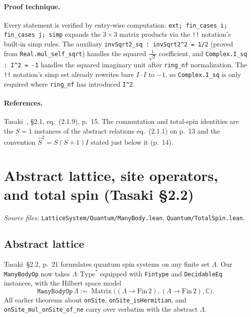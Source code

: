 \documentclass[a4paper,11pt]{article}
\begin{document}
\paragraph{Proof technique.}
Every statement is verified by entry-wise computation:
\texttt{ext; fin\_cases i; fin\_cases j; simp} expands the $3 \times 3$
matrix products via the \texttt{!!} notation's built-in simp rules.
The auxiliary \texttt{invSqrt2\_sq : invSqrt2\textasciicircum 2 = 1/2}
(proved from \texttt{Real.mul\_self\_sqrt}) handles the squared
$\tfrac{1}{\sqrt{2}}$ coefficient, and \texttt{Complex.I\_sq : I\textasciicircum 2 = -1}
handles the squared imaginary unit after \texttt{ring\_nf} normalization.
The \texttt{!!} notation's simp set already rewrites bare $I \cdot I$ to
$-1$, so \texttt{Complex.I\_sq} is only required where
\texttt{ring\_nf} has introduced \texttt{I\textasciicircum 2}.

\paragraph{References.}
Tasaki~\cite{Tasaki:QMB}, §2.1, eq.~(2.1.9), p.~15.
The commutation and total-spin identities are the $S = 1$ instances of
the abstract relations eq.~(2.1.1) on p.~13 and the convention
$\hat S^2 = S(S+1) I$ stated just below it (p.~14).

\section{Abstract lattice, site operators, and total spin (Tasaki §2.2)}
\label{sec:sec22}

\emph{Source files:} \texttt{LatticeSystem/Quantum/ManyBody.lean},
\texttt{Quantum/TotalSpin.lean}.

\subsection{Abstract lattice}

Tasaki~§2.2, p.~21 formulates quantum spin systems on any finite set
$\Lambda$. Our \texttt{ManyBodyOp} now takes $\Lambda : \text{Type}^*$
equipped with \texttt{Fintype} and \texttt{DecidableEq} instances, with
the Hilbert space model
\[
  \texttt{ManyBodyOp}\,\Lambda
    := \operatorname{Matrix}\bigl((\Lambda \to \mathrm{Fin}\,2),
        (\Lambda \to \mathrm{Fin}\,2), \mathbb{C}\bigr).
\]
All earlier theorems about \texttt{onSite}, \texttt{onSite\_isHermitian},
and \texttt{onSite\_mul\_onSite\_of\_ne} carry over verbatim with the
abstract $\Lambda$.
\end{document}
